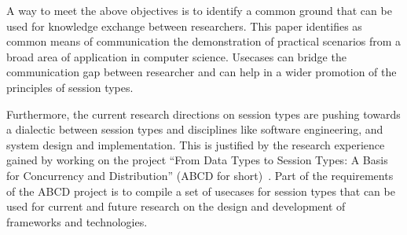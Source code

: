 A way to meet the above objectives is to identify a common
ground that can be used for knowledge exchange between researchers.
This paper identifies as common means of communication the demonstration
of practical scenarios from a broad area of application in computer science.
Usecases can bridge the communication gap between researcher and can help
in a wider promotion of the principles of session types.

Furthermore, the current research directions on session types are
pushing towards a dialectic between session types and disciplines
like software engineering, and system design and implementation.
This is justified by the research experience gained by working
on the project
``From Data Types to Session Types: A Basis for Concurrency and Distribution''
(ABCD for short)~\cite{ABCD}.
Part of the requirements of the ABCD project is to compile a set of usecases
for session types that can be used for current and future research on
the design and development of frameworks and technologies.

